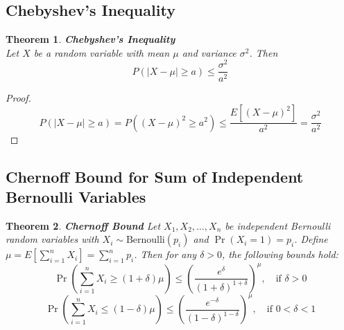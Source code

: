 \documentclass[11pt]{book} %
\newtheorem{theorem}{Theorem}[section]
\begin{document}
\subsection{Chebyshev's Inequality}

\begin{boxA}
    \begin{theorem}{\textbf{Chebyshev's Inequality}} \\
        Let $X$ be a random variable with mean $\mu$ and variance $\sigma^2$. Then
        \begin{equation*}
            P(|X - \mu| \geq a) \leq \frac{\sigma^2}{a^2}
        \end{equation*}
    \end{theorem}
\end{boxA}

\begin{proof}
    \begin{equation}
        P(|X - \mu| \geq a) = P((X - \mu)^2 \geq a^2) \leq \frac{E[(X - \mu)^2]}{a^2} = \frac{\sigma^2}{a^2}
    \end{equation}
\end{proof}


\subsection{Chernoff Bound for Sum of Independent Bernoulli Variables}

\begin{boxA}
    \begin{theorem}{\textbf{Chernoff Bound}}
        Let \(X_1, X_2, \ldots, X_n\) be independent Bernoulli random variables with \(X_i \sim \text{Bernoulli}(p_i)\) and \( \Pr(X_i = 1) = p_i \). Define \( \mu = E\left[\sum_{i=1}^n X_i\right] = \sum_{i=1}^n p_i \). Then for any \( \delta > 0 \), the following bounds hold:
        \begin{equation*}
            \Pr\left(\sum_{i=1}^n X_i \geq (1 + \delta) \mu\right) \leq \left(\frac{e^\delta}{(1+\delta)^{1+\delta}}\right)^\mu, \quad \text{if } \delta > 0
        \end{equation*}
        \begin{equation*}
            \Pr\left(\sum_{i=1}^n X_i \leq (1 - \delta) \mu\right) \leq \left(\frac{e^{-\delta}}{(1-\delta)^{1-\delta}}\right)^\mu, \quad \text{if } 0 < \delta < 1
        \end{equation*}
    \end{theorem}
\end{boxA}
\end{document}
